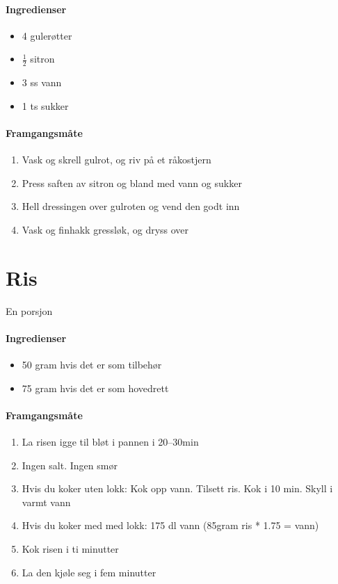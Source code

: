 \documentclass[12pt,a4paper]{book}
\begin{document}
{\paragraph{Ingredienser}
\begin{itemize}[noitemsep]
	\item 4 gulerøtter
	\item $\frac{1}{2}$  sitron
	\item 3 ss vann
	\item 1 ts sukker
\end{itemize}

\paragraph{Framgangsmåte}
\begin{enumerate}[noitemsep]
	\item Vask og skrell gulrot, og riv på et råkostjern
	\item Press saften av sitron og bland med vann og sukker
	\item Hell dressingen over gulroten og vend den godt inn
	\item Vask og finhakk gressløk, og dryss over
\end{enumerate}
\clearpage{}
\clearpage{}\section{﻿Ris}
\label{ris}
En porsjon

\paragraph{Ingredienser}
\begin{itemize}[noitemsep]
	\item 50 gram hvis det er som tilbehør
	\item 75 gram hvis det er som hovedrett
\end{itemize}

\paragraph{Framgangsmåte}
\begin{enumerate}[noitemsep]
	\item La risen igge til bløt i pannen i 20--30min
	\item Ingen salt. Ingen smør
	\item Hvis du koker uten lokk: Kok opp vann. Tilsett ris. Kok i 10 min. Skyll i varmt vann
	\item Hvis du koker med med lokk: 175 dl vann (85gram ris * 1.75 = vann)
	\item Kok risen i ti minutter
	\item La den kjøle seg i fem minutter
\end{enumerate}

}
\end{document}

